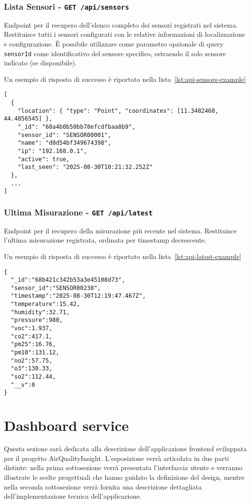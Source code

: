 \subsubsection{Lista Sensori - \texttt{GET /api/sensors}}

Endpoint per il recupero dell'elenco completo dei sensori registrati nel sistema.
Restituisce tutti i sensori configurati con le relative informazioni di localizzazione e configurazione.
È possibile utilizzare come parametro opzionale di query \texttt{sensorId} come identificativo del sensore specifico,
estraendo il solo sensore indicato (se disponibile).

Un esempio di risposta di successo è riportato nella lista~\ref{lst:api-sensors-example}
\begin{lstlisting}[caption={Risposta di sucesso per endpoint \texttt{sensors}},label=lst:api-sensors-example]
[
  {
    "location": { "type": "Point", "coordinates": [11.3482468, 44.4856545] },
    "_id": "68a4b0b50bb78efcdfbaa8b9",
    "sensor_id": "SENSOR00001",
    "name": "d0d54bf349674398",
    "ip": "192.168.0.1",
    "active": true,
    "last_seen": "2025-08-30T10:21:32.252Z"
  },
  ...
]
\end{lstlisting}

\subsubsection{Ultima Misurazione - \texttt{GET /api/latest}}

Endpoint per il recupero della misurazione più recente nel sistema.
Restituisce l'ultima misurazione registrata, ordinata per timestamp decrescente.

Un esempio di risposta di successo è riportato nella lista~\ref{lst:api-latest-example}
\begin{lstlisting}[caption={Risposta di sucesso per endpoint \texttt{latest}},label=lst:api-latest-example]
{
  "_id":"68b421c342b53a3e45108d73",
  "sensor_id":"SENSOR00238",
  "timestamp":"2025-08-30T12:19:47.467Z",
  "temperature":15.42,
  "humidity":32.71,
  "pressure":980,
  "voc":1.937,
  "co2":417.1,
  "pm25":16.76,
  "pm10":131.12,
  "no2":57.75,
  "o3":130.33,
  "so2":112.44,
  "__v":0
}
\end{lstlisting}

\section{Dashboard service}

Questa sezione sarà dedicata alla descrizione dell'applicazione frontend sviluppata per il progetto AirQualityInsight.
L'esposizione verrà articolata in due parti distinte: nella prima sottosezione verrà presentata
l'interfaccia utente e verranno illustrate le scelte progettuali che hanno guidato la definizione del design,
mentre nella seconda sottosezione verrà fornita una descrizione dettagliata dell'implementazione
tecnica dell'applicazione.

